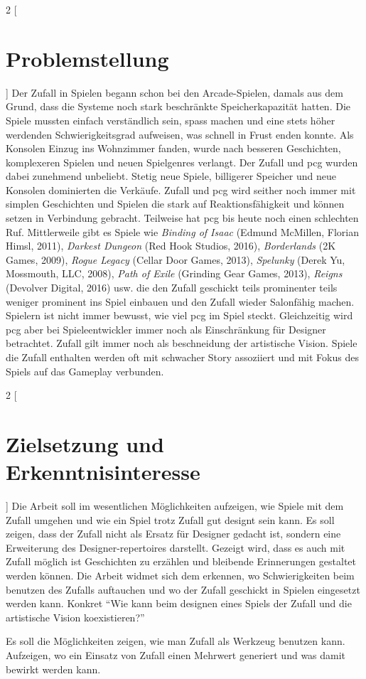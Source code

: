 \documentclass[10pt,a4paper]{article}
\begin{document}
\begin{multicols}{2}
[
\section{Problemstellung}
]
Der Zufall in Spielen begann schon bei den Arcade-Spielen, damals aus dem Grund, dass die Systeme noch stark beschränkte Speicherkapazität hatten. Die Spiele mussten einfach verständlich sein, spass machen und eine stets höher werdenden Schwierigkeitsgrad aufweisen, was schnell in Frust enden konnte. Als Konsolen Einzug ins Wohnzimmer fanden, wurde nach besseren Geschichten, komplexeren Spielen und neuen Spielgenres verlangt. Der Zufall und \gls{pcg} wurden dabei zunehmend unbeliebt. Stetig neue Spiele, billigerer Speicher und neue Konsolen dominierten die Verkäufe. Zufall und \gls{pcg} wird seither noch immer mit simplen Geschichten und Spielen die stark auf Reaktionsfähigkeit und können setzen in Verbindung gebracht. Teilweise hat \gls{pcg} bis heute noch einen schlechten Ruf. Mittlerweile gibt es Spiele wie \textit{Binding of Isaac} (Edmund McMillen, Florian Himsl, 2011), \textit{Darkest Dungeon} (Red Hook Studios, 2016), \textit{Borderlands} (2K Games, 2009), \textit{Rogue Legacy} (Cellar Door Games, 2013), \textit{Spelunky} (Derek Yu, Mossmouth, LLC, 2008), \textit{Path of Exile} (Grinding Gear Games, 2013), \textit{Reigns} (Devolver Digital, 2016) usw. die den Zufall geschickt teils prominenter teils weniger prominent ins Spiel einbauen und den Zufall wieder Salonfähig machen. Spielern ist nicht immer bewusst, wie viel \gls{pcg} im Spiel steckt. Gleichzeitig wird \gls{pcg} aber bei Spieleentwickler immer noch als Einschränkung für Designer betrachtet. Zufall gilt immer noch als beschneidung der artistische Vision. Spiele die Zufall enthalten werden oft mit schwacher Story assoziiert und mit Fokus des Spiels auf das Gameplay verbunden.
\end{multicols}

\begin{multicols}{2}
[
\section{Zielsetzung und Erkenntnisinteresse}
]
Die Arbeit soll im wesentlichen Möglichkeiten aufzeigen, wie Spiele mit dem Zufall umgehen und wie ein Spiel trotz Zufall gut designt sein kann. Es soll zeigen, dass der Zufall nicht als Ersatz für Designer gedacht ist, sondern eine Erweiterung des Designer-repertoires darstellt. Gezeigt wird, dass es auch mit Zufall möglich ist Geschichten zu erzählen und bleibende Erinnerungen gestaltet werden können. Die Arbeit widmet sich dem erkennen, wo Schwierigkeiten beim benutzen des Zufalls auftauchen und wo der Zufall geschickt in Spielen eingesetzt werden kann. Konkret “Wie kann beim designen eines Spiels der Zufall und die artistische Vision koexistieren?”

Es soll die Möglichkeiten zeigen, wie man Zufall als Werkzeug benutzen kann. Aufzeigen, wo ein Einsatz von Zufall einen Mehrwert generiert und was damit bewirkt werden kann.
\end{multicols}
\end{document}
